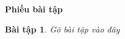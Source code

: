 \documentclass[12pt,a4paper]{article}
\author{Vũ Ngọc Binh}
\newtheorem{baitap}{Bài tập}
\begin{document}
	\begin{center}
		{\Large \textbf{Phiếu bài tập}}
	\end{center}

\begin{baitap}
	Gõ bài tập vào đây
\end{baitap}
\end{document}
